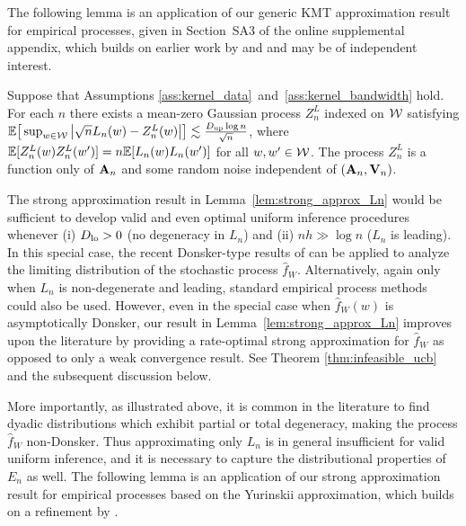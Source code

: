 The following lemma is an application of our generic
KMT approximation result for empirical processes,
given in Section~SA3 of
the online supplemental appendix,
which builds on earlier work by \citet{gine2004kernel}
and \citet{gine2010confidence} and may be of independent interest.

\begin{lemma}
  \label{lem:strong_approx_Ln}
  Suppose that Assumptions
  \ref{ass:kernel_data}~and~\ref{ass:kernel_bandwidth} hold.
  For each $n$ there exists
  a mean-zero Gaussian process
  $Z^L_n$ indexed on $\mathcal{W}$ satisfying
  $\mathbb{E}\big[ \sup_{w \in \mathcal{W}} \big| \sqrt{n} L_n(w) -  Z_n^L(w) \big| \big]
  \lesssim \frac{D_{\textup{up}} \log n}{\sqrt{n}}$,
  where $\mathbb{E}[Z_n^L(w)Z_n^L(w')] =  n\mathbb{E}[L_n(w)L_n(w')]$ for all $w, w' \in \mathcal{W}$.
  The process $Z_n^L$
  is a function only of $\mathbf{A}_n$ and some random noise
  independent of $(\mathbf{A}_n, \mathbf{V}_n)$.
\end{lemma}

The strong approximation result in Lemma~\ref{lem:strong_approx_Ln} would be
sufficient to develop valid and even optimal
uniform inference procedures whenever
(i) $D_{\textup{lo}} > 0$ (no degeneracy in $L_n$) and
(ii) $n h \gg \log n$ ($L_n$ is leading).
In this special case, the recent Donsker-type results of
\citet{davezies2021exchangeable}
can be applied to analyze the limiting distribution
of the stochastic process $\hat{f}_W$.
Alternatively,
again only when $L_n$ is non-degenerate and leading,
standard empirical process methods could also be used.
However, even in the special case when $\hat{f}_W(w)$ is asymptotically
Donsker, our result in Lemma~\ref{lem:strong_approx_Ln}
improves upon the literature by providing a rate-optimal strong approximation
for $\hat{f}_W$ as opposed to only a weak convergence result.
See Theorem \ref{thm:infeasible_ucb} and the subsequent
discussion below.

More importantly, as illustrated above,
it is common in the literature to find dyadic
distributions which exhibit partial or total degeneracy, making the process
$\hat{f}_W$ non-Donsker.
Thus approximating only $L_n$ is in general insufficient
for valid uniform inference,
and it is necessary to capture the distributional properties of $E_n$ as well.
The following lemma is an application of
our strong approximation result for
empirical processes based on the Yurinskii approximation,
which builds on a refinement by \citet{belloni2019conditional}.

